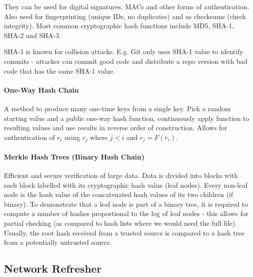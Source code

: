 They can be used for digital signatures, MACs and other forms of authentication. Also used for fingerprinting (unique IDs, no duplicates) and as checksums (check integrity). Most common cryptographic hash functions include MD5, SHA-1, SHA-2 and SHA-3.

SHA-1 is known for collision attacks. E.g. Git only uses SHA-1 value to identify commits - attacker can commit good code and distribute a repo version with bad code that has the same SHA-1 value.


\paragraph{One-Way Hash Chain}
A method to produce many one-time keys from a single key. Pick a random starting value and a public one-way hash function, continuously apply function to resulting values and use results in reverse order of construction. Allows for authentication of $r_i$ using $r_j$ where $j < i$ and $r_j = F(r_i)$.

\paragraph{Merkle Hash Trees (Binary Hash Chain)}
Efficient and secure verification of large data. Data is divided into blocks with each block labelled with its cryptographic hash value (leaf nodes). Every non-leaf node is the hash value of the concatenated hash values of its two children (if binary). To demonstrate that a leaf node is part of a binary tree, it is required to compute a number of hashes proportional to the log of leaf nodes - this allows for partial checking (as compared to hash lists where we would need the full file). Usually, the root hash received from a trusted source is compared to a hash tree from a potentially untrusted source.









\subsection{Network Refresher}

